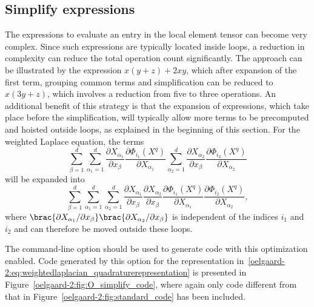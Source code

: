 \subsection{Simplify expressions}
\label{oelgaard-2:sec:simplify_expressions}

The expressions to evaluate an entry in the local element tensor can
become very complex. Since such expressions are typically located
inside loops, a reduction in complexity can reduce the total operation
count significantly.  The approach can be illustrated by the
expression $x (y + z) + 2 x y$, which after expansion of the first
term, grouping common terms and simplification can be reduced to $x (3
y + z)$, which involves a reduction from five to three operations.  An
additional benefit of this strategy is that the expansion of
expressions, which take place before the simplification, will
typically allow more terms to be precomputed and hoisted outside
loops, as explained in the beginning of this section.  For the
weighted Laplace equation, the terms
%
\begin{equation}
  \sum_{\beta=1}^d
  \sum_{\alpha_1=1}^d
    \frac{\partial X_{\alpha_1}}{\partial x_{\beta}}
    \frac{\partial \Phi_{i_1}(X^q)}{\partial X_{\alpha_1}}
  \sum_{\alpha_2=1}^d
    \frac{\partial X_{\alpha_2}}{\partial x_{\beta}}
    \frac{\partial \Phi_{i_2}(X^q)}{\partial X_{\alpha_2}}
\end{equation}
%
will be expanded into
%
\begin{equation}
  \sum_{\beta=1}^d
  \sum_{\alpha_1=1}^d
  \sum_{\alpha_2=1}^d
  \frac{\partial X_{\alpha_1}}{\partial x_{\beta}}
  \frac{\partial X_{\alpha_2}}{\partial x_{\beta}}
  \frac{\partial \Phi_{i_1}(X^q)}{\partial X_{\alpha_1}}
  \frac{\partial \Phi_{i_2}(X^q)}{\partial X_{\alpha_2}},
\end{equation}
%
where $\brac{\partial X_{\alpha_1} / \partial x_{\beta}}
\brac{\partial X_{\alpha_2} / \partial x_{\beta}}$ is independent of
the indices $i_1$ and $i_2$ and can therefore be moved outside these
loops.

The \ffc{} command-line option  should
be used to generate code with this optimization enabled.  Code
generated by this option for the representation
in~\eqref{oelgaard-2:eq:weightedlaplacian_quadraturerepresentation} is
presented in Figure~\ref{oelgaard-2:fig:O_simplify_code}, where again
only code different from that in
Figure~\ref{oelgaard-2:fig:standard_code} has been included.

